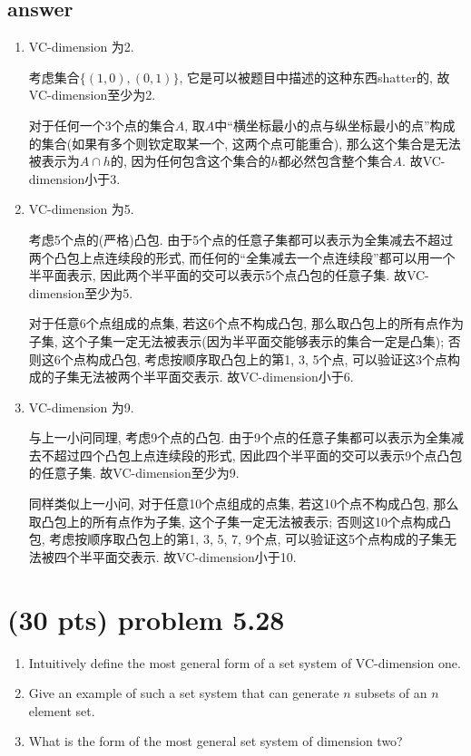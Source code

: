 \documentclass[12pt]{article}
\begin{document}
	\subsection*{answer}
	\begin{enumerate}
		\item VC-dimension 为2. 
		
		考虑集合$\{(1, 0), (0, 1)\}$, 它是可以被题目中描述的这种东西shatter的, 故VC-dimension至少为2. 
		
		对于任何一个3个点的集合$A$, 取$A$中“横坐标最小的点与纵坐标最小的点”构成的集合(如果有多个则钦定取某一个, 这两个点可能重合),
		那么这个集合是无法被表示为$A \cap h$的, 因为任何包含这个集合的$h$都必然包含整个集合$A$. 故VC-dimension小于3.
		
		\item VC-dimension 为5.
		
		考虑5个点的(严格)凸包. 由于5个点的任意子集都可以表示为全集减去不超过两个凸包上点连续段的形式, 而任何的“全集减去一个点连续段”都可以用一个半平面表示,
		因此两个半平面的交可以表示5个点凸包的任意子集. 故VC-dimension至少为5.
		
		对于任意6个点组成的点集, 若这6个点不构成凸包, 那么取凸包上的所有点作为子集, 这个子集一定无法被表示(因为半平面交能够表示的集合一定是凸集);
		否则这6个点构成凸包, 考虑按顺序取凸包上的第1, 3, 5个点, 可以验证这3个点构成的子集无法被两个半平面交表示. 故VC-dimension小于6.
		
		\item VC-dimension 为9.
		
		与上一小问同理, 考虑9个点的凸包. 由于9个点的任意子集都可以表示为全集减去不超过四个凸包上点连续段的形式,
		因此四个半平面的交可以表示9个点凸包的任意子集. 故VC-dimension至少为9.
		
		同样类似上一小问, 对于任意10个点组成的点集, 若这10个点不构成凸包, 那么取凸包上的所有点作为子集, 这个子集一定无法被表示; 否则这10个点构成凸包,
		考虑按顺序取凸包上的第1, 3, 5, 7, 9个点, 可以验证这5个点构成的子集无法被四个半平面交表示. 故VC-dimension小于10.
		
	\end{enumerate}
	\section{(30 pts) problem 5.28}
	\begin{enumerate}
		\item Intuitively define the most general form of a set system of
		VC-dimension one.
		\item Give an example of such a set system that can generate $n$ subsets of
		an $n$ element set.
		\item What is the form of the most general set system of dimension two?
	\end{enumerate}
\end{document}
